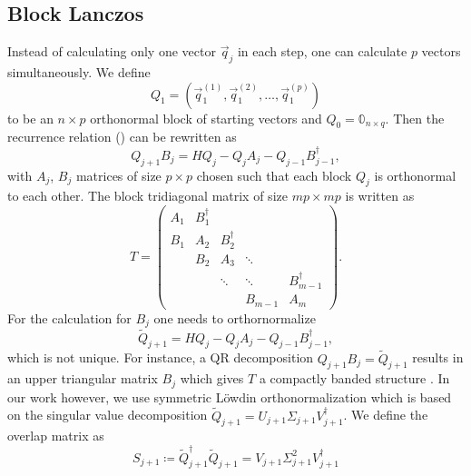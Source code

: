 \subsection{Block Lanczos}

Instead of calculating only one vector $\vec{q}_j$ in each step,
one can calculate $p$ vectors simultaneously.
We define
\begin{equation}
    Q_1 = (\vec{q}_1^{(1)}, \vec{q}_1^{(2)}, \ldots, \vec{q}_1^{(p)})
\end{equation}
to be an $n\times p$ orthonormal block of starting vectors
and $Q_0 = \mathbb{0}_{n\times q}$.
Then the recurrence relation () can be rewritten as
\begin{equation}
    Q_{j+1} B_j = H Q_j - Q_j A_j - Q_{j-1} B_{j-1}^\dag,
    \label{eq:block-Lanczos-recurrence}
\end{equation}
with $A_j$, $B_j$ matrices of size $p\times p$ chosen such that each block $Q_j$ is orthonormal
to each other.
The block tridiagonal matrix of size $mp\times mp$ is written as
\begin{equation}
    T
    =
    \begin{pmatrix}
        A_1 & B_1^\dag &          &         &              \\
        B_1 & A_2      & B_2^\dag &         &              \\
            & B_2      & A_3      & \ddots  &              \\
            &          & \ddots   & \ddots  & B_{m-1}^\dag \\
            &          &          & B_{m-1} & A_m
    \end{pmatrix}.
\end{equation}
For the calculation for $B_j$ one needs to orthornormalize
\begin{equation}
    \tilde Q_{j+1} = H Q_j - Q_j A_j - Q_{j-1} B_{j-1}^\dag,
\end{equation}
which is not unique.
For instance, a QR decomposition $Q_{j+1} B_j = \tilde Q_{j+1}$
results in an upper triangular matrix $B_j$ which gives $T$ a compactly banded structure
\cite{Cullum1985, Golub2013}.
In our work however, we use symmetric Löwdin orthonormalization \cite{Lowdin1950, Brass2021}
which is based on the singular value decomposition
$\tilde Q_{j+1} = U_{j+1} \Sigma_{j+1} V_{j+1}^\dag$.
We define the overlap matrix as
\begin{equation}
    S_{j+1} \coloneqq \tilde Q_{j+1}^\dag \tilde Q_{j+1} = V_{j+1} \Sigma_{j+1}^2 V_{j+1}^\dagger
\end{equation}
